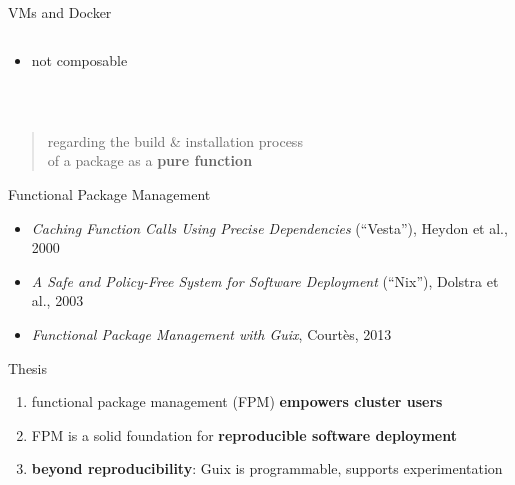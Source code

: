 \documentclass{beamer}
\begin{document}
\begin{frame}{VMs and Docker}
{\begin{columns}
\begin{column}[t]
\begin{itemize}

      \item not composable
      \end{itemize}
    \end{column}
  \end{columns}
  }
\end{frame}


\begin{frame}
  \\[2em]
  \begin{quote}
    \large{
    regarding the build \& installation process\\
    of a package as a \textbf{pure function}}
  \end{quote}
\end{frame}

\begin{frame}{Functional Package Management}
  \Large{
    \begin{itemize}
    \item<3-> \textit{Caching Function Calls Using Precise Dependencies}
      (``Vesta''), Heydon et al., 2000
    \item \textit{A Safe and Policy-Free System for Software Deployment}
      (``Nix''), Dolstra et al., 2003
    \item<2-> \textit{Functional Package Management with Guix}, Courtès,
      2013
    \end{itemize}
  }
\end{frame}

\begin{frame}{Thesis}

  \Large{
    \begin{enumerate}
    \item functional package management (FPM) \textbf{empowers cluster
      users}
    \item FPM is a solid foundation for \textbf{reproducible software
      deployment}
    \item \textbf{beyond reproducibility}: Guix is programmable, supports
      experimentation
    \end{enumerate}
  }
\end{frame}
\end{document}
